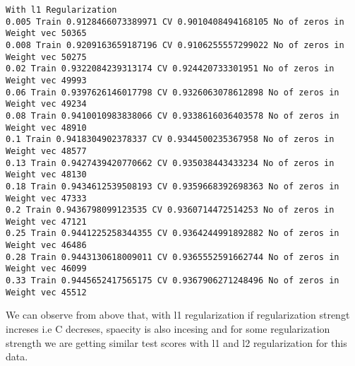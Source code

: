 \documentclass[11pt]{article}
\begin{document}
    \begin{Verbatim}[commandchars=\\\{\}]
With l1 Regularization
0.005 Train 0.9128466073389971 CV 0.9010408494168105 No of zeros in Weight vec 50365
0.008 Train 0.9209163659187196 CV 0.9106255557299022 No of zeros in Weight vec 50275
0.02 Train 0.9322084239313174 CV 0.924420733301951 No of zeros in Weight vec 49993
0.06 Train 0.9397626146017798 CV 0.9326063078612898 No of zeros in Weight vec 49234
0.08 Train 0.9410010983838066 CV 0.9338616036403578 No of zeros in Weight vec 48910
0.1 Train 0.9418304902378337 CV 0.9344500235367958 No of zeros in Weight vec 48577
0.13 Train 0.9427439420770662 CV 0.935038443433234 No of zeros in Weight vec 48130
0.18 Train 0.9434612539508193 CV 0.9359668392698363 No of zeros in Weight vec 47333
0.2 Train 0.9436798099123535 CV 0.9360714472514253 No of zeros in Weight vec 47121
0.25 Train 0.9441225258344355 CV 0.9364244991892882 No of zeros in Weight vec 46486
0.28 Train 0.9443130618009011 CV 0.9365552591662744 No of zeros in Weight vec 46099
0.33 Train 0.9445652417565175 CV 0.9367906271248496 No of zeros in Weight vec 45512

    \end{Verbatim}

    We can observe from above that, with l1 regularization if regularization
strengt increses i.e C decreses, spaecity is also incesing and for some
regularization strength we are getting similar test scores with l1 and
l2 regularization for this data.
\end{document}
